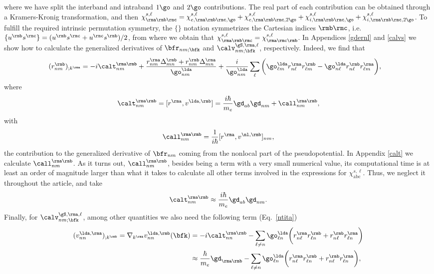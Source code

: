 \documentclass[floatfix,prb,aps,superscriptaddress,11pt,preprint,letterpaper]{revtex4}
\begin{document}
where we have split the interband and intraband $1\go$ and $2\go$
contributions. The real part of each contribution can be obtained through
a Kramers-Kronig transformation,\cite{nicolas} and then
$\chi^{s,\ell}_{\rma\rmb\rmc}=\chi^{s,\ell}_{e,\rma\rmb\rmc,\go}+\chi^{s,\ell}_{e,\rma\rmb\rmc,2\go}+\chi^{s,\ell}_{i,\rma\rmb\rmc,\go}+\chi^{s,\ell}_{i,\rma\rmb\rmc,2\go}
$.
To 
fulfill the required intrinsic
permutation symmetry,\cite{rashkeevPRB98} 
the
$\{\}$ notation symmetrizes the Cartesian indices $\rmb\rmc$, i.e. 
$\{u^{\rmb}s^{\rmc}\}=(u^{\rmb}s^{\rmc}+u^{\rmc}s^{\rmb})/2$,
from where we obtain that
$\chi_{\rma\rmb\rmc}^{s,\ell}=\chi_{\rma\rmc\rmb}^{s,\ell}$.
In Appendices \ref{gdernl} and \ref{calvs} we show how to calculate  
the generalized derivatives of $\bfr_{nm;\bfk}$ and
$\calv^{\gS,\rma,\ell}_{nm;\bfk}$, respectively. 
Indeed, we find that
\begin{align}\label{rgen.69}
(r^{\rmb}_{nm})_{;k^{\rma}}
&=
-i\calt^{\rma\rmb}_{nm}
+
\frac{
r^{\rma}_{nm}
\Delta^{\rmb}_{mn}
+r^{\rmb}_{nm}
\Delta^{\rma}_{mn}
}
{\go^\lda_{nm}}
+
\frac{i}{\go^\lda_{nm}}
\sum_{\ell}
\bigg(
\go^\lda_{\ell m}
r^{\rma}_{n\ell}
r^{\rmb}_{\ell m}
-
\go^\lda_{n\ell}
r^{\rmb}_{n\ell}
r^{\rma}_{\ell m}
\bigg)
,
\end{align}
where
\begin{align}\label{tau.1}
\calt_{nm}^{\rma\rmb}
=
[r^{\rma},v^{\lda,\rmb}]= 
\frac{i\hbar}{m_e}\gd_{ab}\gd_{nm}+
\call_{nm}^{\rma\rmb}
,
\end{align}  
with
\begin{align}\label{tau.2}
\call_{nm}^{\rma\rmb}
=
\frac{1}{i\hbar}[r^{\rma},v^{\nl,\rmb}]_{nm}
,
\end{align}
the contribution to the generalized derivative of $\bfr_{nm}$
coming from the nonlocal part of the pseudopotential.
In Appendix \ref{calt} we calculate
$\call^{\rma\rmb}_{nm}$.  
As it turns out, $\call^{\rma\rmb}_{nm}$, 
besides being a term with a very small numerical value, 
its computational time is at least an order of magnitude larger
 than what it takes to calculate all other terms involved in the expressions for 
$\chi^{s,\ell}_{\mathrm{abc}}$.\cite{valerie}
Thus, we neglect it throughout the article, and take
\begin{align}\label{tau.69}
\calt_{nm}^{\rma\rmb}
\approx
\frac{i\hbar}{m_e}\gd_{ab}\gd_{nm}
.
\end{align} 
Finally,
for $\calv^{\gS,\rma,\ell}_{nm;\bfk}$, among other quantities we also
need the following term (Eq.~\eqref{ntita})
\begin{align}\label{a.3c}
(v^{\lda,\rma}_{nn})_{;k^\rmb}
=
\nabla_{k^{\rma}}  
v^{\lda,\rmb}_{nn}(\bfk)
&=
-i\calt^{\rma\rmb}_{nn}
-
\sum_{\ell\ne n}
\go^\lda_{\ell n}
\bigg(  
r^{\rma}_{n\ell}  
r^\rmb_{\ell n}
+  
r^\rmb_{n\ell}  
r^{\rma}_{\ell n}
\bigg)
\nonumber\\
&\approx
\frac{\hbar}{m_e}\gd_{\rma\rmb}
-
\sum_{\ell\ne n}
\go^\lda_{\ell n}
\bigg(  
r^{\rma}_{n\ell}  
r^\rmb_{\ell n}
+  
r^\rmb_{n\ell}  
r^{\rma}_{\ell n}
\bigg)
,
\end{align}  
\end{document}
